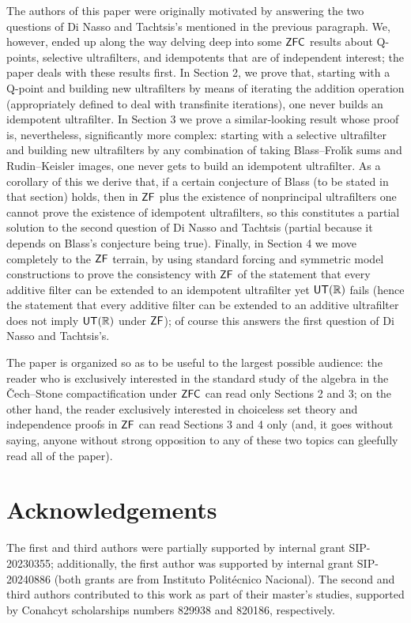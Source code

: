 \documentclass[10pt]{amsart}
\newcommand{\zf}{\mathnormal{\mathsf{ZF}}}
\newcommand{\zfc}{\mathnormal{\mathsf{ZFC}}}
\newcommand{\utr}{\mathnormal{\mathsf{UT}(\mathbb R)}}
\theoremstyle{definition}
\theoremstyle{remark}
\begin{document}
The authors of this paper were originally motivated by answering the two questions of Di Nasso and Tachtsis's mentioned in the previous paragraph. We, however, ended up along the way delving deep into some $\zfc$ results about Q-points, selective ultrafilters, and idempotents that are of independent interest; the paper deals with these results first. In Section 2, we prove that, starting with a Q-point and building new ultrafilters by means of iterating the addition operation (appropriately defined to deal with transfinite iterations), one never builds an idempotent ultrafilter. In Section 3 we prove a similar-looking result whose proof is, nevertheless, significantly more complex: starting with a selective ultrafilter and building new ultrafilters by any combination of taking Blass--Frol\'{\i}k sums and Rudin--Keisler images, one never gets to build an idempotent ultrafilter. As a corollary of this we derive that, if a certain conjecture of Blass (to be stated in that section) holds, then in $\zf$ plus the existence of nonprincipal ultrafilters one cannot prove the existence of idempotent ultrafilters, so this constitutes a partial solution to the second question of Di Nasso and Tachtsis (partial because it depends on Blass's conjecture being true). Finally, in Section 4 we move completely to the $\zf$ terrain, by using standard forcing and symmetric model constructions to prove the consistency with $\zf$ of the statement that every additive filter can be extended to an idempotent ultrafilter yet $\utr$ fails (hence the statement that every additive filter can be extended to an additive ultrafilter does not imply $\utr$ under $\zf$); of course this answers the first question of Di Nasso and Tachtsis's.

The paper is organized so as to be useful to the largest possible audience: the reader who is exclusively interested in the standard study of the algebra in the \v{C}ech--Stone compactification under $\zfc$ can read only Sections 2 and 3; on the other hand, the reader exclusively interested in choiceless set theory and independence proofs in $\zf$ can read Sections 3 and 4 only (and, it goes without saying, anyone without strong opposition to any of these two topics can gleefully read all of the paper).


\section*{Acknowledgements}

The first and third authors were partially supported by internal grant SIP-20230355; additionally, the first author was supported by internal grant SIP-20240886 (both grants are from Instituto Polit\'ecnico Nacional). The second and third authors contributed to this work as part of their master's studies, supported by Conahcyt scholarships numbers 829938 and 820186, respectively.
\end{document}
